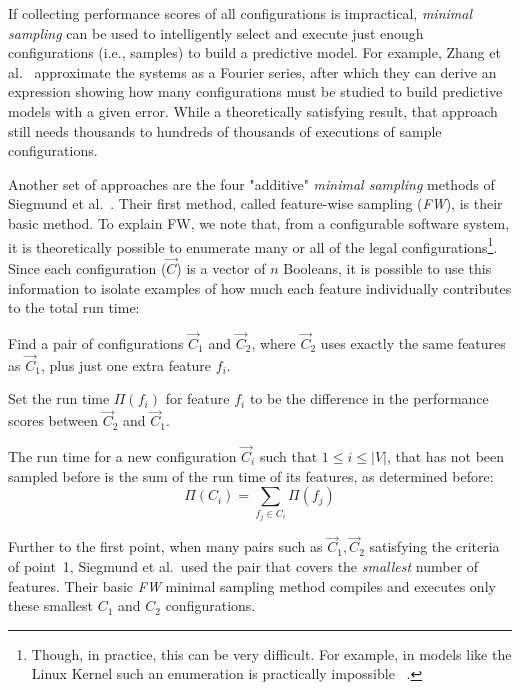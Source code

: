 \documentclass{newsig}
\begin{document}
 If collecting performance scores of all configurations is impractical,  {\em minimal sampling} 
 can be used to intelligently select and execute just enough configurations (i.e., samples) to build a
 predictive model.
 For example, Zhang et al.~\cite{zhang2015performance} approximate the
 systems as a Fourier series, after which they can derive an expression showing how many configurations must be studied
 to build predictive models with a given error. While a theoretically satisfying result, that approach still needs thousands to hundreds of thousands of executions of sample
 configurations.  

Another set of approaches are the four "additive" {\em minimal sampling} methods of Siegmund et al.~\cite{siegmund2012predicting}.
Their first method, called feature-wise sampling ({\em FW}), is their basic method.
To explain FW, we note that, from a configurable software system, it is theoretically possible to enumerate many or all of the legal configurations\footnote{Though, in practice, this can be very difficult. For example, in models like the Linux Kernel such an enumeration is practically impossible ~\cite{sayyad13b}.}. 
Since each configuration ($\vec{C}$) is a vector of $n$ Booleans, it  is possible to use this information to isolate examples of how much each feature individually contributes to the total run time:
\begin{compactenum}
\item Find a pair of  configurations $\vec{C}_1$ and $\vec{C}_2$, where $\vec{C}_2$ uses exactly the same features as $\vec{C}_1$, plus just one  extra feature $f_i$.
\item Set the run time $\Pi(f_i)$ for feature $f_i$ to be the difference in the performance scores between $\vec{C}_2$ and $\vec{C}_1$.
\item The run time  for a new configuration  $\vec{C}_i$ such that $1\leq i\leq \left\vert{V}\right\vert$, that has not been sampled before is the sum of the run time of its features, as determined before:
\begin{equation}
  \Pi(C_i) = \sum_{f_j \in C_i}\Pi(f_j)  
\end{equation}
\end{compactenum}

Further to the first point, when many pairs such as ${\vec{C}_1,\vec{C}_2}$ satisfying the criteria of point~1, Siegmund et al.\ used the 
pair that covers the {\em smallest} number of features. Their basic {\em FW} minimal sampling method 
compiles and executes only these smallest $C_1$ and $C_2$ configurations. 
\end{document}
